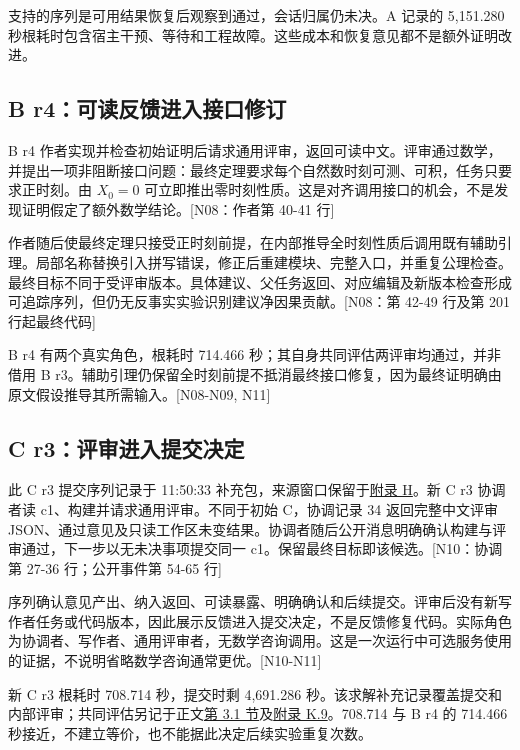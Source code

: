支持的序列是可用结果恢复后观察到通过，会话归属仍未决。A 记录的 5,151.280 秒根耗时包含宿主干预、等待和工程故障。这些成本和恢复意见都不是额外证明改进。

\subsection[B r4：可读反馈进入接口修订]{\texorpdfstring{\protect\hypertarget{g7}{}B r4：可读反馈进入接口修订}{B r4：可读反馈进入接口修订}}
B r4 作者实现并检查初始证明后请求通用评审，返回可读中文。评审通过数学，并提出一项非阻断接口问题：最终定理要求每个自然数时刻可测、可积，任务只要求正时刻。由 $X_0=0$ 可立即推出零时刻性质。这是对齐调用接口的机会，不是发现证明假定了额外数学结论。[N08：作者第 40-41 行]

作者随后使最终定理只接受正时刻前提，在内部推导全时刻性质后调用既有辅助引理。局部名称替换引入拼写错误，修正后重建模块、完整入口，并重复公理检查。最终目标不同于受评审版本。具体建议、父任务返回、对应编辑及新版本检查形成可追踪序列，但仍无反事实实验识别建议净因果贡献。[N08：第 42-49 行及第 201 行起最终代码]

B r4 有两个真实角色，根耗时 714.466 秒；其自身共同评估两评审均通过，并非借用 B r3。辅助引理仍保留全时刻前提不抵消最终接口修复，因为最终证明确由原文假设推导其所需输入。[N08-N09, N11]

\subsection[C r3：评审进入提交决定]{\texorpdfstring{\protect\hypertarget{g8}{}C r3：评审进入提交决定}{C r3：评审进入提交决定}}
此 C r3 提交序列记录于 11:50:33 补充包，来源窗口保留于\hyperlink{appendix-h}{附录 H}。新 C r3 协调者读 c1、构建并请求通用评审。不同于初始 C，协调记录 34 返回完整中文评审 JSON、通过意见及只读工作区未变结果。协调者随后公开消息明确确认构建与评审通过，下一步以无未决事项提交同一 c1。保留最终目标即该候选。[N10：协调第 27-36 行；公开事件第 54-65 行]

序列确认意见产出、纳入返回、可读暴露、明确确认和后续提交。评审后没有新写作者任务或代码版本，因此展示反馈进入提交决定，不是反馈修复代码。实际角色为协调者、写作者、通用评审者，无数学咨询调用。这是一次运行中可选服务使用的证据，不说明省略数学咨询通常更优。[N10-N11]

新 C r3 根耗时 708.714 秒，提交时剩 4,691.286 秒。该求解补充记录覆盖提交和内部评审；共同评估另记于正文\href{zh.pdf\#section-3-1}{第 3.1 节}及\hyperlink{k9}{附录 K.9}。708.714 与 B r4 的 714.466 秒接近，不建立等价，也不能据此决定后续实验重复次数。

